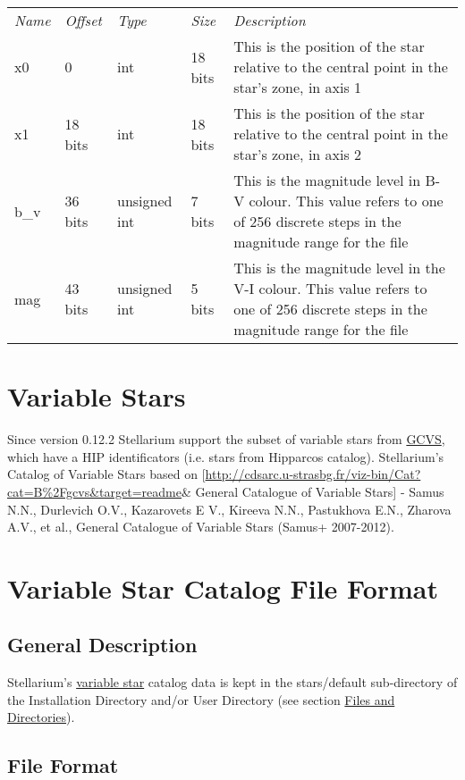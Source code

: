 \begin{longtable}[c]{@{}lllll@{}}
\toprule
\emph{Name} & \emph{Offset} & \emph{Type} & \emph{Size} &
\emph{Description}\tabularnewline
x0 & 0 & int & 18 bits & This is the position of the star relative to
the central point in the star's zone, in axis 1\tabularnewline
x1 & 18 bits & int & 18 bits & This is the position of the star relative
to the central point in the star's zone, in axis 2\tabularnewline
b\_v & 36 bits & unsigned int & 7 bits & This is the magnitude level in
B-V colour. This value refers to one of 256 discrete steps in the
magnitude range for the file\tabularnewline
mag & 43 bits & unsigned int & 5 bits & This is the magnitude level in
the V-I colour. This value refers to one of 256 discrete steps in the
magnitude range for the file\tabularnewline
\bottomrule
\end{longtable}

\section{Variable Stars}
Since version 0.12.2 Stellarium support the subset of variable stars
from \href{http://www.sai.msu.su/gcvs/gcvs/}{GCVS}, which have a HIP
identificators (i.e. stars from Hipparcos catalog). Stellarium's Catalog
of Variable Stars based on
{[}\url{http://cdsarc.u-strasbg.fr/viz-bin/Cat?cat=B\%2Fgcvs\&target=readme}\&
General Catalogue of Variable Stars{]} - Samus N.N., Durlevich O.V.,
Kazarovets E V., Kireeva N.N., Pastukhova E.N., Zharova A.V., et al.,
General Catalogue of Variable Stars (Samus+ 2007-2012).

\section{Variable Star Catalog File
Format}\label{variable-star-catalog-file-format}

\subsection{General Description}\label{general-description}

Stellarium's \href{Variable_Stars}{variable star} catalog data is kept
in the stars/default sub-directory of the Installation Directory and/or
User Directory (see section
\href{Advanced_Use\#Files_and_Directories}{Files and Directories}).

\subsection{File Format}\label{file-format}

